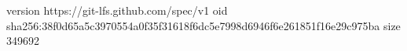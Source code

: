 version https://git-lfs.github.com/spec/v1
oid sha256:38f0d65a5c3970554a0f35f31618f6dc5e7998d6946f6e261851f16e29c975ba
size 349692
